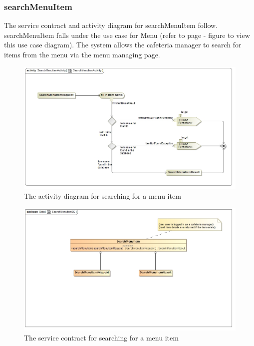 \documentclass[a4paper,12pt]{article}
\begin{document}
 \subsubsection{searchMenuItem}
The service contract and activity diagram for searchMenuItem follow. searchMenuItem falls under the use case for Menu (refer to page   - figure   to view this use case diagram). The system allows the cafeteria manager to search for items from the menu via the menu managing page.
\begin{figure}[H]
  \centering
    \includegraphics[width=1.0\textwidth]{../images/SearchMenuItemActivity.jpg}
    \caption{The activity diagram for searching for a menu item } 
\end{figure}
\begin{figure}[H]
	\centering
	\includegraphics[width=1.0\textwidth]{../images/SearchMenuItemSC.jpg}
	\caption{The service contract for searching for a menu item}
\end{figure}
\end{document}
